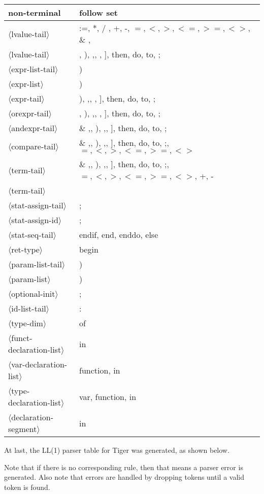 \documentclass[11pt, fleqn]{article}
\newcommand{\atag}[1]{$\langle$#1$\rangle$}
\begin{document}
\begin{longtable}{l|l}
non-terminal						&	follow set												\\
\hline
\atag{lvalue-tail}				&	:=, *, /	, +, -, $=, <, >, <=, >=, <>$, \& , \\
\atag{lvalue-tail}				&	\textbar , ), ,, , ], then, do, to, ; 	\\
\atag{expr-list-tail}			&	)												\\
\atag{expr-list}					&	)								\\
\atag{expr-tail}					&	), ,, , ], then, do, to, ;	\\
\atag{orexpr-tail}				&	\textbar , ), ,, , ], then, do, to, ;	\\
\atag{andexpr-tail}				&	\& ,\textbar , ), ,, ], then, do, to, ; 	\\
\atag{compare-tail}				&	\& ,\textbar , ), ,, ], then, do, to, ;, $=, <, >, <=, >=, <>$	\\
\atag{term-tail}					&	\& ,\textbar , ), ,, ], then, do, to, ;, $=, <, >, <=, >=, <>$, +, -	\\
\atag{term-tail}					&	\\
\atag{stat-assign-tail}			&	;	\\
\atag{stat-assign-id}			&	;	\\
\atag{stat-seq-tail}				&	endif, end, enddo, else		\\
\atag{ret-type}					&	begin		\\
\atag{param-list-tail}			&	)	\\
\atag{param-list}				&	)		\\
\atag{optional-init}				&	;		\\
\atag{id-list-tail}				&	:		\\
\atag{type-dim}					&	of	\\
\atag{funct-declaration-list}	&	in	\\
\atag{var-declaration-list}		&	function, in	\\
\atag{type-declaration-list}		&	var, function, in		\\
\atag{declaration-segment}		&	in	\\
\end{longtable}

At last, the LL(1) parser table for Tiger was generated, as shown below.

Note that if there is no corresponding rule, then that means a parser error is generated.
Also note that errors are handled by dropping tokens until a valid token is found.
\end{document}
